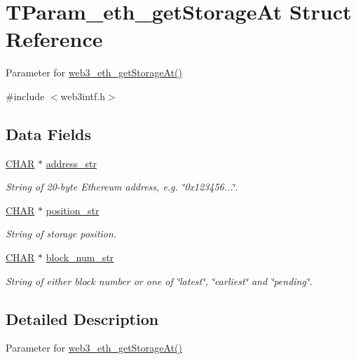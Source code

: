 \hypertarget{struct_t_param__eth__get_storage_at}{}\section{T\+Param\+\_\+eth\+\_\+get\+Storage\+At Struct Reference}
\label{struct_t_param__eth__get_storage_at}


Parameter for \mbox{\hyperlink{web3intf_8c_a5bded37fe47d7967324a7c453752a58f}{web3\+\_\+eth\+\_\+get\+Storage\+At()}}  




{\ttfamily \#include $<$web3intf.\+h$>$}

\subsection*{Data Fields}
\begin{DoxyCompactItemize}
\item 
\mbox{\hyperlink{boattypes_8h_aebb9e13210d88d43e32e735ada43a425}{C\+H\+AR}} $\ast$ \mbox{\hyperlink{struct_t_param__eth__get_storage_at_ab1b9f5fe62033b1d7fb013b2e8718c03}{address\+\_\+str}}
\begin{DoxyCompactList}\small\item\em String of 20-\/byte Ethereum address, e.\+g. \char`\"{}0x123456...\char`\"{}. \end{DoxyCompactList}\item 
\mbox{\hyperlink{boattypes_8h_aebb9e13210d88d43e32e735ada43a425}{C\+H\+AR}} $\ast$ \mbox{\hyperlink{struct_t_param__eth__get_storage_at_a7d4838817e646edb3cc1875676850c69}{position\+\_\+str}}
\begin{DoxyCompactList}\small\item\em String of storage position. \end{DoxyCompactList}\item 
\mbox{\hyperlink{boattypes_8h_aebb9e13210d88d43e32e735ada43a425}{C\+H\+AR}} $\ast$ \mbox{\hyperlink{struct_t_param__eth__get_storage_at_af78d86478ad38ef1fecad6bfb059bd27}{block\+\_\+num\+\_\+str}}
\begin{DoxyCompactList}\small\item\em String of either block number or one of \char`\"{}latest\char`\"{}, \char`\"{}earliest\char`\"{} and \char`\"{}pending\char`\"{}. \end{DoxyCompactList}\end{DoxyCompactItemize}


\subsection{Detailed Description}
Parameter for \mbox{\hyperlink{web3intf_8c_a5bded37fe47d7967324a7c453752a58f}{web3\+\_\+eth\+\_\+get\+Storage\+At()}} 

